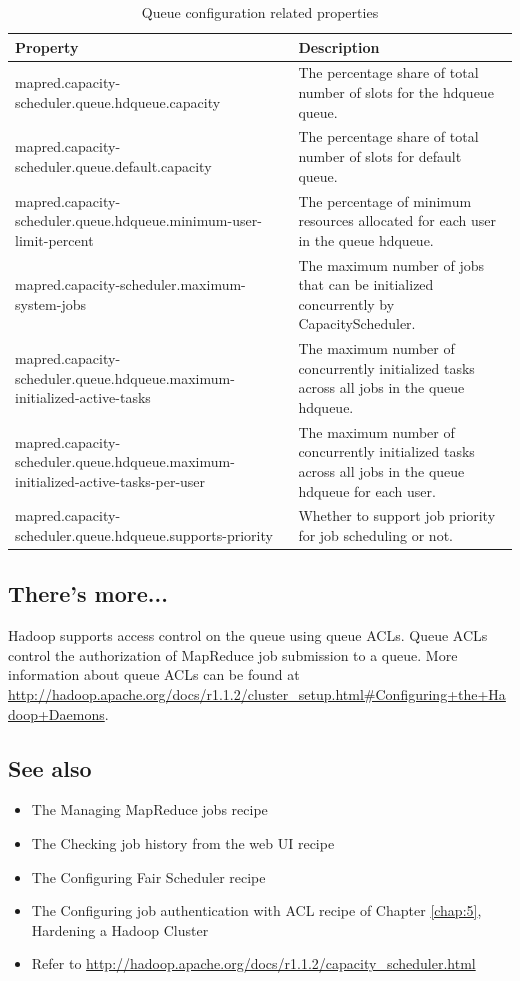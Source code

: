 \begin{table}[h]
  \scriptsize
  \centering
  \begin{tabular}{p{}p{}}
    \toprule 
    \textbf{Property} & \textbf{Description} \\ \midrule
    mapred.capacity-scheduler.queue.hdqueue.capacity & The percentage share of total number of slots for the hdqueue queue. \\
    mapred.capacity-scheduler.queue.default.capacity & The percentage share of total number of slots for default queue.\\
    mapred.capacity-scheduler.queue.hdqueue.minimum-user-limit-percent & The percentage of minimum resources allocated for each user in the queue hdqueue. \\
    mapred.capacity-scheduler.maximum-system-jobs & The maximum number of jobs that can be initialized concurrently by CapacityScheduler. \\
    mapred.capacity-scheduler.queue.hdqueue.maximum-initialized-active-tasks & The maximum number of concurrently initialized tasks across all jobs in the queue hdqueue. \\
    mapred.capacity-scheduler.queue.hdqueue.maximum-initialized-active-tasks-per-user & The maximum number of concurrently initialized tasks across all jobs in the queue hdqueue for each user. \\
    mapred.capacity-scheduler.queue.hdqueue.supports-priority & Whether to support job priority for job scheduling or not. \\ \bottomrule
  \end{tabular}
  \caption{Queue configuration related properties}\label{tbl:queueconfig}
\end{table}

\subsection*{There's more...}
Hadoop supports access control on the queue using queue ACLs. Queue ACLs control the authorization of MapReduce job submission to a queue. More information about queue ACLs can be found at \url{http://hadoop.apache.org/docs/r1.1.2/cluster_setup.html#Configuring+the+Hadoop+Daemons}.

\subsection*{See also}
\begin{itemize}
  \item The Managing MapReduce jobs recipe
  \item The Checking job history from the web UI recipe
  \item The Configuring Fair Scheduler recipe
  \item The Configuring job authentication with ACL recipe of Chapter \ref{chap:5}, Hardening a Hadoop Cluster
  \item Refer to \url{http://hadoop.apache.org/docs/r1.1.2/capacity_scheduler.html}
\end{itemize}

